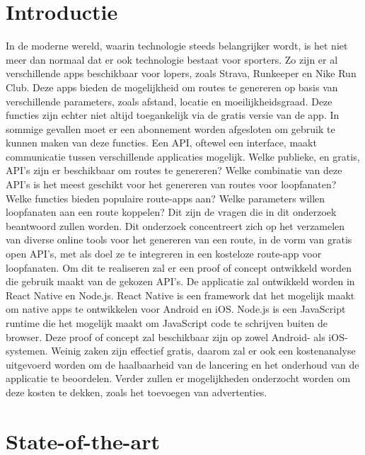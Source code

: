 
\section{Introductie}%
\label{sec:introductie}

In de moderne wereld, waarin technologie steeds belangrijker wordt, is het niet meer dan normaal dat er ook technologie bestaat voor sporters. Zo zijn er al verschillende apps beschikbaar voor lopers, zoals Strava, Runkeeper en Nike Run Club.
Deze apps bieden de mogelijkheid om routes te genereren op basis van verschillende parameters, zoals afstand, locatie en moeilijkheidsgraad. Deze functies zijn echter niet altijd toegankelijk via de gratis versie van de app. 
In sommige gevallen moet er een abonnement worden afgesloten om gebruik te kunnen maken van deze functies. Een API, oftewel een interface, maakt communicatie tussen verschillende applicaties mogelijk.
Welke publieke, en gratis, API's zijn er beschikbaar om routes te genereren? Welke combinatie van deze API's is het meest geschikt voor het genereren van routes voor loopfanaten? Welke functies bieden populaire route-apps aan? Welke parameters willen loopfanaten aan een route koppelen? Dit zijn de vragen die in dit onderzoek beantwoord zullen worden.
Dit onderzoek concentreert zich op het verzamelen van diverse online tools voor het genereren van een route, in de vorm van gratis open API's, met als doel ze te integreren in een kosteloze route-app voor loopfanaten. 
Om dit te realiseren zal er een proof of concept ontwikkeld worden die gebruik maakt van de gekozen API's. De applicatie zal ontwikkeld worden in React Native en Node.js. React Native is een framework dat het mogelijk maakt om native apps te ontwikkelen voor Android en iOS\@. Node.js is een JavaScript runtime die het mogelijk maakt om JavaScript code te schrijven buiten de browser.
Deze proof of concept zal beschikbaar zijn op zowel Android- als iOS-systemen. Weinig zaken zijn effectief gratis, daarom zal er ook een kostenanalyse uitgevoerd worden om de haalbaarheid van de lancering en het onderhoud van de applicatie te beoordelen. 
Verder zullen er mogelijkheden onderzocht worden om deze kosten te dekken, zoals het toevoegen van advertenties.



\section{State-of-the-art}%
\label{sec:state-of-the-art}

